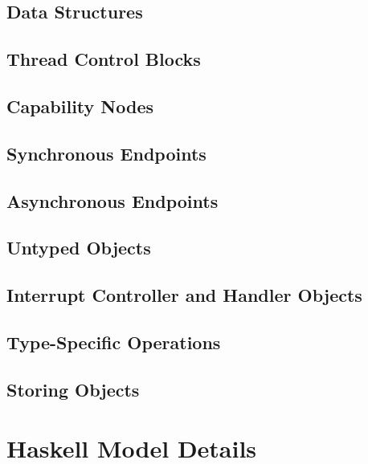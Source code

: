\documentclass{ertos-book}
\begin{document}
\section[structures]{Data Structures}


\section[tcb]{Thread Control Blocks}


\section[cnode]{Capability Nodes}


\section[endpoint]{Synchronous Endpoints}


\section[asyncendpoint]{Asynchronous Endpoints}


\section[untyped]{Untyped Objects}


\section[interrupt]{Interrupt Controller and Handler Objects}


\section[objecttype]{Type-Specific Operations}


\section[instances]{Storing Objects}


\chapter[model]{Haskell Model Details}
\end{document}
